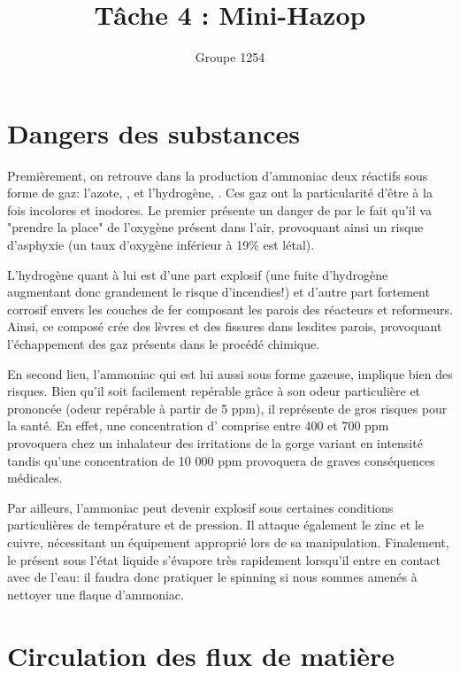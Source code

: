 \documentclass[a4paper,12pt, oneside]{article}
\title{Tâche 4 : Mini-Hazop}
\author{Groupe 1254}
\begin{document}
\maketitle
\section{Dangers des substances}
Premièrement, on retrouve dans la production d'ammoniac deux réactifs sous forme de gaz: l'azote, , et l'hydrogène, . Ces gaz ont la particularité d'être à la fois incolores et inodores. Le premier présente un danger de par le fait qu'il va "prendre la place" de l'oxygène présent dans l'air, provoquant ainsi un risque d'asphyxie (un taux d'oxygène inférieur à 19\% est létal). 
		
		L'hydrogène quant à lui est d'une part explosif (une fuite d'hydrogène augmentant donc grandement le risque d'incendies!) et d'autre part fortement corrosif envers les couches de fer composant les parois des réacteurs et reformeurs. Ainsi, ce composé crée des lèvres et des fissures dans lesdites parois, provoquant l'échappement des gaz présents dans le procédé chimique.
		
		En second lieu, l'ammoniac qui est lui aussi sous forme gazeuse, implique bien des risques. Bien qu'il soit facilement repérable grâce à son odeur particulière et prononcée (odeur repérable à partir de 5 ppm), il représente de gros risques pour la santé. En effet, une concentration d' comprise entre 400 et 700 ppm provoquera chez un inhalateur des irritations de la gorge variant en intensité tandis qu'une concentration de 10 000 ppm provoquera de graves conséquences médicales.

		Par ailleurs, l'ammoniac peut devenir explosif sous certaines conditions particulières de température et de pression. Il attaque également le zinc et le cuivre, nécessitant un équipement approprié lors de sa manipulation. Finalement, le  présent sous l'état liquide s'évapore très rapidement lorsqu'il entre en contact avec de l'eau: il faudra donc pratiquer le spinning si nous sommes amenés à nettoyer une  flaque d'ammoniac.

\section{Circulation des flux de matière}
\end{document}
